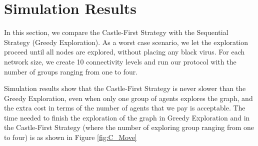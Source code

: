 \section{Simulation Results}
In this section, we compare the {\sc Castle-First} Strategy with the Sequential Strategy ({\sc Greedy} Exploration).
As a worst case scenario, we let the exploration proceed until all nodes are explored, without placing any black virus. 
For each network size, we create 10 connectivity levels and run our protocol with the number of groups ranging from one to four.

Simulation results show that the {\sc Castle-First} Strategy is never slower than the {\sc Greedy} Exploration, even when only one group of agents explores the graph,  and the extra cost in terms of the number of agents that we pay is acceptable. The time needed to finish the exploration of the graph in {\sc Greedy} Exploration and in the {\sc Castle-First} Strategy (where the number of exploring group ranging from one to four) is as shown in Figure \ref{fig:C_Move}

